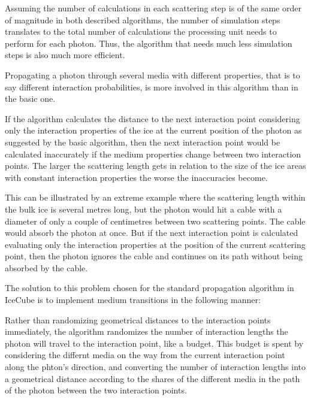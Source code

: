 Assuming the number of calculations in each scattering step is of the same order of magnitude in both described algorithms, the number of simulation steps translates to the total number of calculations the processing unit needs to perform for each photon. Thus, the algorithm that needs much less simulation steps is also much more efficient.

Propagating a photon through several media with different properties, that is to say different interaction probabilities, is more involved in this algorithm than in the basic one.

If the algorithm calculates the distance to the next interaction point considering only the interaction properties of the ice at the current position of the photon as suggested by the basic algorithm, then the next interaction point would be calculated inaccurately if the medium properties change between two interaction points. The larger the scattering length gets in relation to the size of the ice areas with constant interaction properties the worse the inaccuracies become.

This can be illustrated by an extreme example where the scattering length within the bulk ice is several metres long, but the photon would hit a cable with a diameter of only a couple of centimetres between two scattering points. The cable would absorb the photon at once. But if the next interaction point is calculated evaluating only the interaction properties at the position of the current scattering point, then the photon ignores the cable and continues on its path without being absorbed by the cable.

The solution to this problem chosen for the standard propagation algorithm in IceCube is to implement medium transitions in the following manner:

Rather than randomizing geometrical distances to the interaction points immediately, the algorithm randomizes the number of interaction lengths the photon will travel to the interaction point, like a budget. This budget is spent by considering the differnt media on the way from the current interaction point along the phton's direction, and converting the number of interaction lengths into a geometrical distance according to the shares of the different media in the path of the photon between the two interaction points.


